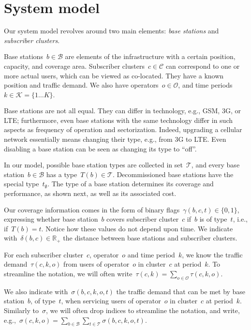 \documentclass[10pt,journal,cspaper,compsoc]{IEEEtran}
\newcommand{\Oc}{\mathcal{O}}
\newcommand{\Bc}{\mathcal{B}}
\newcommand{\Cc}{\mathcal{C}}
\newcommand{\Kc}{\mathcal{K}}
\newcommand{\Tc}{\mathcal{T}}
\begin{document}
\section{System model}
\label{sec:sysmodel}

Our system model revolves around two main elements: {\em base stations} and {\em subscriber clusters}.

Base stations~$b\in\Bc$ are elements of the infrastructure with
a certain position, capacity, and coverage area.
Subscriber clusters~$c\in\Cc$ can correspond to one or more actual users, which can be viewed as co-located. They have a
known position and traffic demand.
We also have operators~$o\in\Oc$, and time periods~$k\in\Kc=\{1\dots K\}$.

Base stations are not all equal. They can differ in technology, e.g., GSM, 3G, or LTE; furthermore,
even base stations with the same technology differ in such aspects as frequency of operation and sectorization.
Indeed, upgrading a cellular network essentially means changing their type, e.g., from 3G to LTE.
Even disabling a base station can be seen as changing its type to ``off''.

In our model, possible base station types are collected in set~$\Tc$, and every base station~$b\in\Bc$
has a type~$T(b)\in\Tc$. Decommissioned base stations have the special type~$t_\emptyset$. The type of a base
station determines its coverage and performance, as shown next, as well as its associated cost.

Our coverage information comes in the form of binary flags~$\gamma(b,c,t)\in\{0,1\}$, expressing whether
base station~$b$ covers subscriber cluster~$c$
if~$b$ is of type~$t$, i.e., if~$T(b)=t$.
Notice how these values do not depend upon time. We indicate
with~$\delta(b,c)\in\mathds{R}_{+}$ the distance between base stations and subscriber clusters.

For each subscriber cluster~$c$, operator~$o$ and time period~$k$,
we know the traffic demand~$\tau(c,k,o)$ from users of operator~$o$ in cluster~$c$ at period~$k$.
To streamline the notation, we will often write~$\tau(c,k)=\sum_{o\in\Oc}\tau(c,k,o)$.

We also indicate with~$\sigma(b,c,k,o,t)$
the traffic demand that can be met by base station~$b$, of type~$t$,
when servicing users of operator~$o$ in cluster~$c$ at period~$k$.
Similarly to~$\sigma$, we will often drop indices to streamline the notation, and write, e.g.,~$\sigma(c,k,o) = \sum_{b\in\Bc}\sum_{t\in\Tc} \sigma(b,c,k,o,t)$.
\end{document}
